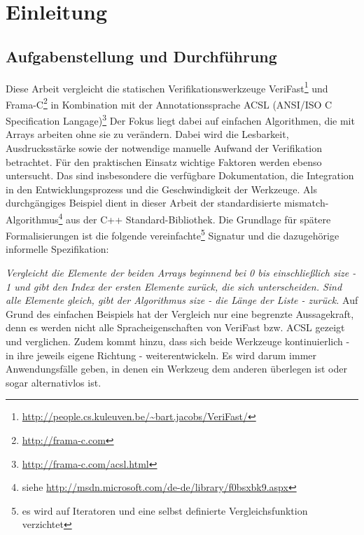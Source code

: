 ﻿\chapter{Einleitung}

\section{Aufgabenstellung und Durchführung}
\label{sec:aufgabenstellung}
Diese Arbeit vergleicht die statischen Verifikationswerkzeuge VeriFast\footnote{
\url{http://people.cs.kuleuven.be/~bart.jacobs/VeriFast/}} und Frama-C\footnote{\url{http://frama-c.com}} in Kombination
mit der Annotationssprache ACSL (ANSI/ISO C Specification Langage)\footnote{\url{http://frama-c.com/acsl.html}} 
Der Fokus liegt dabei auf einfachen Algorithmen, die mit Arrays arbeiten ohne sie zu verändern.
Dabei wird die Lesbarkeit, Ausdrucksstärke sowie der notwendige manuelle Aufwand der Verifikation betrachtet.
Für den praktischen Einsatz wichtige Faktoren werden ebenso untersucht. Das sind insbesondere die verfügbare 
Dokumentation, die Integration in den Entwicklungsprozess und die Geschwindigkeit der Werkzeuge.
\newline
\newline
Als durchgängiges Beispiel dient in dieser Arbeit der standardisierte mismatch-Algorithmus\footnote{siehe
\url{http://msdn.microsoft.com/de-de/library/f0bsxbk9.aspx}} aus
der C++ Standard-Bibliothek. Die Grundlage für spätere Formalisierungen ist die folgende vereinfachte\footnote{es
wird auf Iteratoren und eine selbst definierte Vergleichsfunktion verzichtet} Signatur und 
die dazugehörige informelle Spezifikation:

\lstset{frame=none}    

\lstset{frame=single}

\noindent \emph{Vergleicht die Elemente der beiden Arrays beginnend bei 0 bis einschließlich size - 1 und gibt den
Index der ersten Elemente zurück, die sich unterscheiden. Sind alle Elemente gleich, gibt der Algorithmus
size - die Länge der Liste - zurück.}
\newline
\newline
Auf Grund des einfachen Beispiels hat der Vergleich nur eine begrenzte Aussagekraft, denn es werden nicht alle
Spracheigenschaften von VeriFast bzw. ACSL gezeigt und verglichen. Zudem kommt hinzu, dass sich beide Werkzeuge
kontinuierlich - in ihre jeweils eigene Richtung - weiterentwickeln. Es wird darum immer Anwendungsfälle geben,
in denen ein Werkzeug dem anderen überlegen ist oder sogar alternativlos ist.


